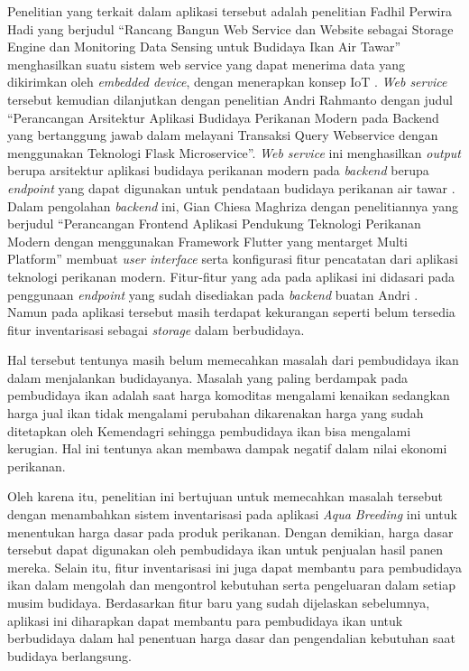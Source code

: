 Penelitian yang terkait dalam aplikasi tersebut adalah penelitian Fadhil Perwira Hadi yang berjudul “Rancang Bangun Web Service dan Website sebagai Storage Engine dan Monitoring Data Sensing untuk Budidaya Ikan Air Tawar” menghasilkan suatu sistem web service yang dapat menerima data yang dikirimkan oleh \textit{embedded device}, dengan menerapkan konsep IoT \citep{fadhil2021}. \textit{Web service} tersebut kemudian dilanjutkan dengan penelitian Andri Rahmanto dengan judul “Perancangan Arsitektur Aplikasi Budidaya Perikanan Modern pada Backend yang bertanggung jawab dalam melayani Transaksi Query Webservice dengan menggunakan Teknologi Flask Microservice”. \textit{Web service} ini menghasilkan \textit{output} berupa arsitektur aplikasi budidaya perikanan modern pada \textit{backend} berupa \textit{endpoint} yang dapat digunakan untuk pendataan budidaya perikanan air tawar \citep{andri2022}. Dalam pengolahan \textit{backend} ini, Gian Chiesa Maghriza dengan penelitiannya yang berjudul “Perancangan Frontend Aplikasi Pendukung Teknologi Perikanan Modern dengan menggunakan Framework Flutter yang mentarget Multi Platform” membuat \textit{user interface} serta konfigurasi fitur pencatatan dari aplikasi teknologi perikanan modern. Fitur-fitur yang ada pada aplikasi ini didasari pada penggunaan \textit{endpoint} yang sudah disediakan pada \textit{backend} buatan Andri \citep{gian2022}. Namun pada aplikasi tersebut masih terdapat kekurangan seperti belum tersedia fitur inventarisasi sebagai \textit{storage} dalam berbudidaya.

Hal tersebut tentunya masih belum memecahkan masalah dari pembudidaya ikan dalam menjalankan budidayanya. Masalah yang paling berdampak pada pembudidaya ikan adalah saat harga komoditas mengalami kenaikan sedangkan harga jual ikan tidak mengalami perubahan dikarenakan harga yang sudah ditetapkan oleh Kemendagri sehingga pembudidaya ikan bisa mengalami kerugian. Hal ini tentunya akan membawa dampak negatif dalam nilai ekonomi perikanan.

Oleh karena itu, penelitian ini bertujuan untuk memecahkan masalah tersebut dengan menambahkan sistem inventarisasi pada aplikasi \textit{Aqua Breeding} ini untuk menentukan harga dasar pada produk perikanan. Dengan demikian, harga dasar tersebut dapat digunakan oleh pembudidaya ikan untuk penjualan hasil panen mereka. Selain itu, fitur inventarisasi ini juga dapat membantu para pembudidaya ikan dalam mengolah dan mengontrol kebutuhan serta pengeluaran dalam setiap musim budidaya. Berdasarkan fitur baru yang sudah dijelaskan sebelumnya, aplikasi ini diharapkan dapat membantu para pembudidaya ikan untuk berbudidaya dalam hal penentuan harga dasar dan pengendalian kebutuhan saat budidaya berlangsung. 

